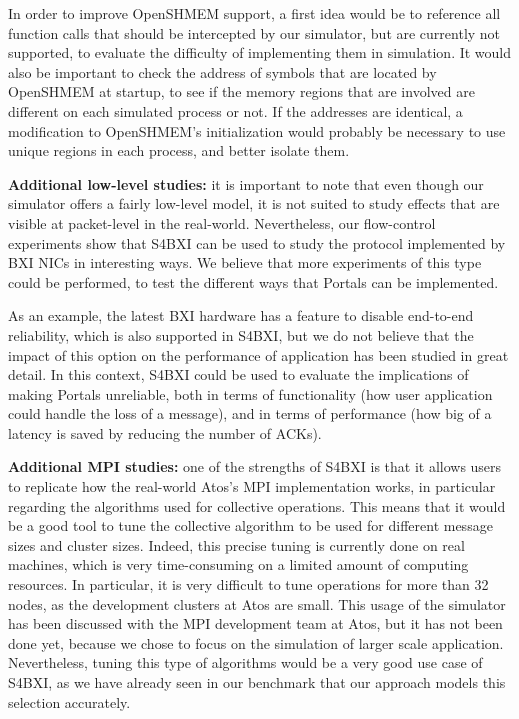 In order to improve OpenSHMEM support, a first idea would be to reference all
function calls that should be intercepted by our simulator, but are currently
not supported, to evaluate the difficulty of implementing them in simulation. It
would also be important to check the address of symbols that are located by
OpenSHMEM at startup, to see if the memory regions that are involved are
different on each simulated process or not. If the addresses are identical, a
modification to OpenSHMEM's initialization would probably be necessary to use
unique regions in each process, and better isolate them.

\bigskip

\textbf{Additional low-level studies:} it is important to note that even though
our simulator offers a fairly low-level model, it is not suited to study effects
that are visible at packet-level in the real-world. Nevertheless, our
flow-control experiments show that S4BXI can be used to study the protocol
implemented by BXI NICs in interesting ways. We believe that more experiments of
this type could be performed, to test the different ways that Portals can be
implemented.

As an example, the latest BXI hardware has a feature to disable end-to-end
reliability, which is also supported in S4BXI, but we do not believe that the
impact of this option on the performance of application has been studied in
great detail. In this context, S4BXI could be used to evaluate the implications
of making Portals unreliable, both in terms of functionality (how user
application could handle the loss of a message), and in terms of performance
(how big of a latency is saved by reducing the number of ACKs).

\bigskip

\textbf{Additional MPI studies:} one of the strengths of S4BXI is that it allows
users to replicate how the real-world Atos's MPI implementation works, in
particular regarding the algorithms used for collective operations. This means
that it would be a good tool to tune the collective algorithm to be used for
different message sizes and cluster sizes. Indeed, this precise tuning is
currently done on real machines, which is very time-consuming on a limited
amount of computing resources. In particular, it is very difficult to tune
operations for more than 32 nodes, as the development clusters at Atos are
small. This usage of the simulator has been discussed with the MPI development
team at Atos, but it has not been done yet, because we chose to focus on the
simulation of larger scale application. Nevertheless, tuning this type of
algorithms would be a very good use case of S4BXI, as we have already seen in
our benchmark that our approach models this selection accurately.

